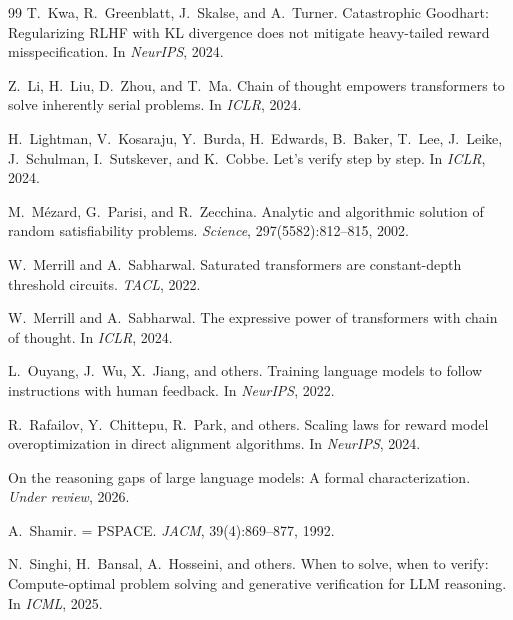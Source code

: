 \documentclass{article}
\theoremstyle{definition}
\theoremstyle{remark}
\begin{document}
\begin{thebibliography}{99}
T.~Kwa, R.~Greenblatt, J.~Skalse, and A.~Turner.
\newblock Catastrophic {G}oodhart: Regularizing {RLHF} with {KL} divergence does not mitigate heavy-tailed reward misspecification.
\newblock In \emph{NeurIPS}, 2024.

Z.~Li, H.~Liu, D.~Zhou, and T.~Ma.
\newblock Chain of thought empowers transformers to solve inherently serial problems.
\newblock In \emph{ICLR}, 2024.

H.~Lightman, V.~Kosaraju, Y.~Burda, H.~Edwards, B.~Baker, T.~Lee, J.~Leike, J.~Schulman, I.~Sutskever, and K.~Cobbe.
\newblock Let's verify step by step.
\newblock In \emph{ICLR}, 2024.

M.~M{\'e}zard, G.~Parisi, and R.~Zecchina.
\newblock Analytic and algorithmic solution of random satisfiability problems.
\newblock \emph{Science}, 297(5582):812--815, 2002.

W.~Merrill and A.~Sabharwal.
\newblock Saturated transformers are constant-depth threshold circuits.
\newblock \emph{TACL}, 2022.

W.~Merrill and A.~Sabharwal.
\newblock The expressive power of transformers with chain of thought.
\newblock In \emph{ICLR}, 2024.

L.~Ouyang, J.~Wu, X.~Jiang, and others.
\newblock Training language models to follow instructions with human feedback.
\newblock In \emph{NeurIPS}, 2022.

R.~Rafailov, Y.~Chittepu, R.~Park, and others.
\newblock Scaling laws for reward model overoptimization in direct alignment algorithms.
\newblock In \emph{NeurIPS}, 2024.

On the reasoning gaps of large language models: A formal characterization.
\newblock \emph{Under review}, 2026.

A.~Shamir.
 = {PSPACE}.
\newblock \emph{JACM}, 39(4):869--877, 1992.

N.~Singhi, H.~Bansal, A.~Hosseini, and others.
\newblock When to solve, when to verify: Compute-optimal problem solving and generative verification for {LLM} reasoning.
\newblock In \emph{ICML}, 2025.


\end{thebibliography}
\end{document}

